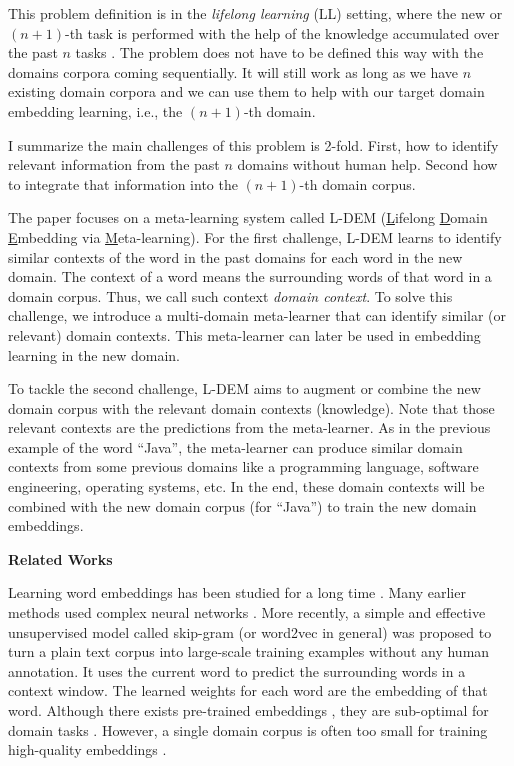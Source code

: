This problem definition is in the
\textit{lifelong learning} (LL) setting, where the new or $(n+1)$-th task is performed with the help of the knowledge accumulated over the past $n$ tasks \cite{ChenLiu2016}. 
The problem does not have to be defined this way with the domains corpora coming sequentially. It will still work as long as we have $n$ existing domain corpora and we can use them to help with our target domain embedding learning, i.e., the $(n+1)$-th domain.

I summarize the main challenges of this problem is 2-fold.
First, how to identify relevant information from the past $n$ domains without human help.
Second how to integrate that information into the $(n+1)$-th domain corpus.

The paper focuses on a meta-learning system called L-DEM (\underline{L}ifelong \underline{D}omain \underline{E}mbedding via \underline{M}eta-learning).
For the first challenge, L-DEM learns to identify similar contexts of the word in the past domains for each word in the new domain. 
The context of a word means the surrounding words of that word in a domain corpus. 
Thus, we call such context \emph{domain context}. 
To solve this challenge, we introduce a multi-domain meta-learner that can identify similar (or relevant) domain contexts.
This meta-learner can later be used in embedding learning in the new domain. 

To tackle the second challenge, L-DEM aims to augment or combine the new domain corpus with the relevant domain contexts (knowledge).
Note that those relevant contexts are the predictions from the meta-learner.
As in the previous example of the word ``Java'', the meta-learner can produce similar domain contexts from some previous domains like a programming language, software engineering, operating systems, etc. In the end, these domain contexts will be combined with the new domain corpus (for ``Java'') to train the new domain embeddings.

\textbf{Related Works}
\label{chap3:rw}

Learning word embeddings has been studied for a long time \cite{mnih2007three}. 
Many earlier methods used complex neural networks \cite{mikolov2013linguistic}.
More recently, a simple and effective unsupervised model called skip-gram (or word2vec in general) \cite{mikolov2013distributed,mikolov2013linguistic} was proposed to turn a plain text corpus into large-scale training examples without any human annotation.
It uses the current word to predict the surrounding words in a context window.
The learned weights for each word are the embedding of that word.
Although there exists pre-trained embeddings \cite{pennington2014glove,bojanowski2016enriching}, they are sub-optimal for domain tasks \cite{bollegala-maehara-kawarabayashi:2015:ACL-IJCNLP,yang-lu-zheng:2017:EMNLP2017,xu_acl2018,Xu2018pro}. 
However, a single domain corpus is often too small for training high-quality embeddings \cite{Xu2018pro}.

